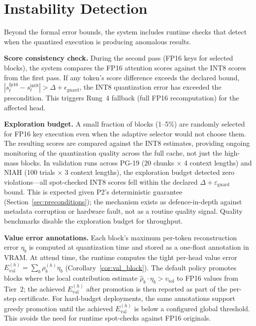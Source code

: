 \documentclass[10pt,twocolumn,a4paper]{article}
\theoremstyle{definition}
\theoremstyle{remark}
\begin{document}
\section{Instability Detection}
\label{sec:instability}

Beyond the formal error bounds, the system includes runtime checks that detect when the quantized execution is producing anomalous results.

\textbf{Score consistency check.}  During the second pass (FP16 keys for selected blocks), the system compares the FP16 attention scores against the INT8 scores from the first pass.  If any token's score difference exceeds the declared bound, $|s_t^{\mathrm{fp16}} - s_t^{\mathrm{int8}}| > \Delta + \epsilon_{\mathrm{guard}}$, the INT8 quantization error has exceeded the precondition.  This triggers Rung~4 fallback (full FP16 recomputation) for the affected head.

\textbf{Exploration budget.}  A small fraction of blocks (1--5\%) are randomly selected for FP16 key execution even when the adaptive selector would not choose them.  The resulting scores are compared against the INT8 estimates, providing ongoing monitoring of the quantization quality across the full cache, not just the high-mass blocks.  In validation runs across PG-19 (20 chunks $\times$ 4 context lengths) and NIAH (100 trials $\times$ 3 context lengths), the exploration budget detected zero violations---all spot-checked INT8 scores fell within the declared $\Delta + \varepsilon_{\mathrm{guard}}$ bound.  This is expected given P2's deterministic guarantee (Section~\ref{sec:preconditions}); the mechanism exists as defence-in-depth against metadata corruption or hardware fault, not as a routine quality signal.  Quality benchmarks disable the exploration budget for throughput.

\textbf{Value error annotations.}  Each block's maximum per-token reconstruction error $\eta_b$ is computed at quantization time and stored as a one-float annotation in VRAM\@.  At attend time, the runtime computes the tight per-head value error $E_{\mathrm{val}}^{(h)} = \sum_b \rho_b^{(h)} \eta_b$ (Corollary~\ref{cor:val_block}).  The default policy promotes blocks where the local contribution estimate $\hat{\rho}_b \cdot \eta_b > v_{\mathrm{tol}}$ to FP16 values from Tier~2; the achieved $E_{\mathrm{val}}^{(h)}$ after promotion is then reported as part of the per-step certificate.  For hard-budget deployments, the same annotations support greedy promotion until the achieved $E_{\mathrm{val}}^{(h)}$ is below a configured global threshold.  This avoids the need for runtime spot-checks against FP16 originals.
\end{document}
